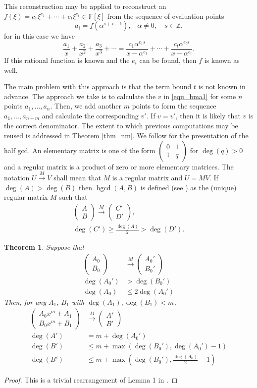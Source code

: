 \documentclass[12pt,reqno]{amsart}
\numberwithin{equation}{section}
\newtheorem{theorem}{Theorem}[section]
\newcommand{\smat}[4] {(\begin{smallmatrix} #1 & #2 \\ #3 & #4 \end{smallmatrix} )}
\newcommand{\matto}[2]  { \left(\begin{array}{cc} #1 \\ #2 \end{array} \right)}
\newcommand{\op}[1]  { \operatorname{ #1 }}
\newcommand{\bbZ}[0]  { \mathbb{Z}}
\newcommand{\bbF}[0]  { \mathbb{F}}
\begin{document}
This reconstruction may be applied to reconstruct an $f(\xi) = c_1 \xi^{e_1} + \cdots + c_t \xi^{e_t} \in \bbF[\xi]$ from the sequence of evaluation points
\begin{equation*}
a_i = f(\alpha^{s+i-1})\text{,} \quad \alpha \neq 0, \quad s \in \bbZ\text{,}
\end{equation*}
for in this case we have
\begin{equation*}
\frac{a_1}{x} + \frac{a_2}{x^2} + \frac{a_3}{x^3} + \cdots = \frac{c_1\alpha^{e_1 s}}{x - \alpha^{e_1}} + \cdots + \frac{c_t\alpha^{e_t s}}{x - \alpha^{e_t}}\text{.}
\end{equation*}
If this rational function is known and the $e_i$ can be found, then $f$ is known as well.

The main problem with this approach is that the term bound $t$ is not known in advance. The approach we take is to calculate the $v$ in \eqref{equ_bma1} for some $n$ points $a_1, \dots, a_{n}$. Then, we add another $m$ points to form the sequence $a_1, \dots, a_{n+m}$ and calculate the corresponding $v'$. If $v=v'$, then it is likely that $v$ is the correct denominator. The extent to which previous computations may be reused is addressed in Theorem \ref{thm_nm}. 
We follow \cite{YAP} for the presentation of the half gcd. An elementary matrix is one of the form $\smat{0}{1}{1}{q}$ for $\deg(q) > 0$ and a regular matrix is a product of zero or more elementary matrices. The notation $U \overset{M}{\longrightarrow} V$ shall mean that $M$ is a regular matrix and $U=MV$. If $\deg(A)>\deg(B)$ then $\op{hgcd}(A,B)$ is defined (see \cite{YAP}) as the (unique) regular matrix $M$ such that
\begin{gather*}
\matto{A}{B} \overset{M}{\longrightarrow} \matto{C'}{D'}\text{,}\\
\deg(C') \ge \frac{\deg(A)}{2} > \deg(D')\text{.}
\end{gather*}

\begin{theorem}
\label{thm_correctness}
Suppose that
\begin{align*}
\matto{A_0}{B_0} &\overset{M}{\longrightarrow} \matto{A_0'}{B_0'}\\
\op{deg}(A_0') &> \deg(B_0')\\
\op{deg}(A_0) &\le 2 \op{deg}(A_0')
\end{align*}
Then, for any $A_1$, $B_1$ with $\deg(A_1),\deg(B_1) < m$,
\begin{align*}
\matto{A_0 x^m + A_1}{B_0 x^m + B_1} &\overset{M}{\longrightarrow} \matto{A'}{B'}\\
\op{deg}(A') &= m + \op{deg}(A_0')\\
\op{deg}(B') &\le m + \op{max}( \deg(B_0'), \deg(A_0')-1)\\
\op{deg}(B') &\le m + \op{max}( \deg(B_0'), \frac{\deg(A_0)}{2}-1)
\end{align*}
\end{theorem}
\begin{proof}
This is a trivial rearrangement of Lemma 1 in \cite{YAP}.
\end{proof}
\end{document}
